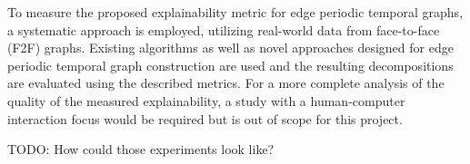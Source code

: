 To measure the proposed explainability metric for edge periodic temporal graphs, a systematic approach is employed, utilizing real-world data from face-to-face (F2F) graphs.
Existing algorithms as well as novel approaches designed for edge periodic temporal graph construction are used and the resulting decompositions are evaluated using the described metrics.
For a more complete analysis of the quality of the measured explainability, a study with a human-computer interaction focus would be required but is out of scope for this project.

TODO: How could those experiments look like?

